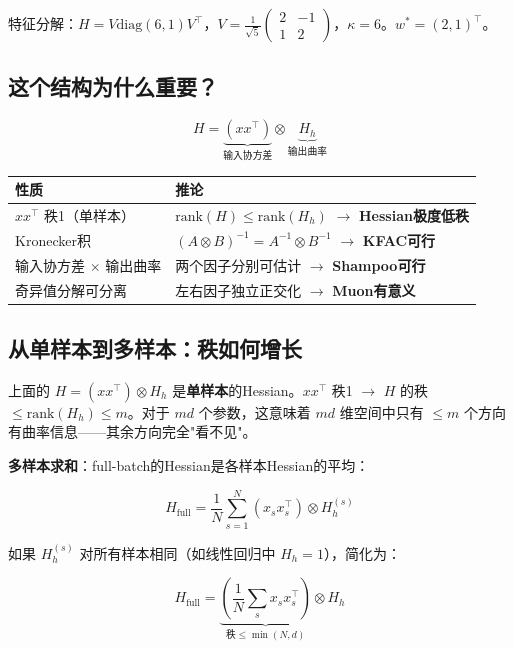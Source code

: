 \documentclass[12pt,a4paper]{article}
\begin{document}
特征分解：$H = V\text{diag}(6,1)V^\top$，$V = \frac{1}{\sqrt{5}}\begin{pmatrix}2&-1\\1&2\end{pmatrix}$，$\kappa = 6$。$w^* = (2,1)^\top$。


\subsection{这个结构为什么重要？}


\[H = \underbrace{(xx^\top)}_{\text{输入协方差}} \otimes \underbrace{H_h}_{\text{输出曲率}}\]







\begin{center}\small
\begin{longtable}{|l|l|}
\hline
性质 & 推论 \\
\hline
$xx^\top$ 秩1（单样本） & $\text{rank}(H) \le \text{rank}(H_h)$ $\to$ \textbf{Hessian极度低秩} \\
Kronecker积 & $(A \otimes B)^{-1} = A^{-1} \otimes B^{-1}$ $\to$ \textbf{KFAC可行} \\
输入协方差 $\times$ 输出曲率 & 两个因子分别可估计 $\to$ \textbf{Shampoo可行} \\
奇异值分解可分离 & 左右因子独立正交化 $\to$ \textbf{Muon有意义} \\
\hline
\end{longtable}
\end{center}

\subsection{从单样本到多样本：秩如何增长}

上面的 $H = (xx^\top) \otimes H_h$ 是\textbf{单样本}的Hessian。$xx^\top$ 秩1 $\to$ $H$ 的秩 $\le \text{rank}(H_h) \le m$。对于 $md$ 个参数，这意味着 $md$ 维空间中只有 $\le m$ 个方向有曲率信息——其余方向完全"看不见"。

\textbf{多样本求和}：full-batch的Hessian是各样本Hessian的平均：

\[H_{\text{full}} = \frac{1}{N}\sum_{s=1}^N (x_s x_s^\top) \otimes H_h^{(s)}\]

如果 $H_h^{(s)}$ 对所有样本相同（如线性回归中 $H_h = 1$），简化为：

\[H_{\text{full}} = \underbrace{\left(\frac{1}{N}\sum_s x_s x_s^\top\right)}_{\text{秩} \le \min(N, d)} \otimes H_h\]
\end{document}
